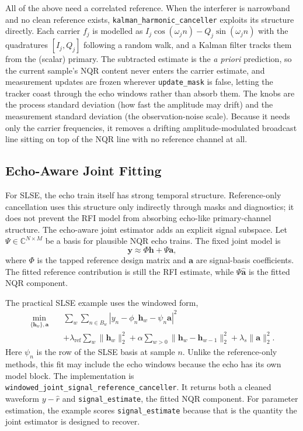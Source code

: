 \documentclass[11pt,oneside]{report}
\newcommand{\code}[1]{\texttt{#1}}
\begin{document}
All of the above need a correlated reference. When the interferer is narrowband
and no clean reference exists, \code{kalman\_harmonic\_canceller} exploits its
structure directly. Each carrier \(f_j\) is modelled as
\(I_j\cos(\omega_j n) - Q_j\sin(\omega_j n)\) with the quadratures
\([I_j, Q_j]\) following a random walk, and a Kalman filter tracks them from the
(scalar) primary. The subtracted estimate is the \emph{a priori} prediction, so
the current sample's NQR content never enters the carrier estimate, and
measurement updates are frozen wherever \code{update\_mask} is false, letting the
tracker coast through the echo windows rather than absorb them. The knobs are the
process standard deviation (how fast the amplitude may drift) and the measurement
standard deviation (the observation-noise scale). Because it needs only the
carrier frequencies, it removes a drifting amplitude-modulated broadcast line
sitting on top of the NQR line with no reference channel at all.

\subsection{Echo-Aware Joint Fitting}

For SLSE, the echo train itself has strong temporal structure. Reference-only
cancellation uses this structure only indirectly through masks and diagnostics;
it does not prevent the RFI model from absorbing echo-like primary-channel
structure. The echo-aware joint estimator adds an explicit signal subspace.
Let \(\Psi\in\mathbb{C}^{N\times M}\) be a basis for plausible NQR echo trains.
The fixed joint model is
\[
  \mathbf{y} \approx \Phi\mathbf{h}+\Psi\mathbf{a},
\]
where \(\Phi\) is the tapped reference design matrix and \(\mathbf{a}\) are
signal-basis coefficients. The fitted reference contribution is still the RFI
estimate, while \(\Psi\widehat{\mathbf{a}}\) is the fitted NQR component.

The practical SLSE example uses the windowed form,
\[
\begin{split}
  \min_{\{\mathbf{h}_w\},\mathbf{a}}\quad
  &\sum_w\sum_{n\in B_w}
    \left|y_n-\phi_n\mathbf{h}_w-\psi_n\mathbf{a}\right|^2 \\
  &+ \lambda_{\mathrm{ref}}\sum_w\|\mathbf{h}_w\|_2^2
   + \alpha\sum_{w>0}\|\mathbf{h}_w-\mathbf{h}_{w-1}\|_2^2
   + \lambda_s\|\mathbf{a}\|_2^2.
\end{split}
\]
Here \(\psi_n\) is the row of the SLSE basis at sample \(n\). Unlike the
reference-only methods, this fit may include the echo windows because the echo
has its own model block. The implementation is
\code{windowed\_joint\_signal\_\allowbreak reference\_canceller}. It returns
both a cleaned waveform \(y-\widehat{r}\) and \code{signal\_estimate}, the
fitted NQR component. For parameter estimation, the example scores
\code{signal\_estimate} because that is the quantity the joint estimator is
designed to recover.
\end{document}
